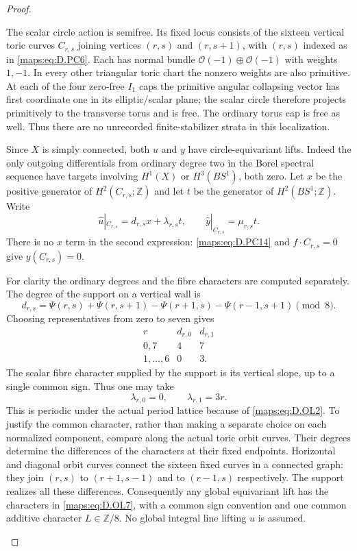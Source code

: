 \begin{proof}
\begin{enumerate}[label=\arabic*.,leftmargin=*]
The scalar circle action is semifree. Its fixed locus consists of
the sixteen vertical toric curves $C_{r,s}$ joining vertices
$(r,s)$ and $(r,s+1)$, with $(r,s)$ indexed as in \eqref{maps:eq:D.PC6}.
Each has normal bundle $\mathcal O(-1)\oplus\mathcal O(-1)$
with weights $1,-1$. In every other triangular toric chart the
nonzero weights are also primitive. At each of the four zero-free
$I_1$ caps the primitive angular collapsing vector has first
coordinate one in its elliptic/scalar plane; the scalar circle
therefore projects primitively to the transverse torus and is
free. The ordinary torus cap is free as well. Thus there are no
unrecorded finite-stabilizer strata in this localization.

Since $X$ is simply connected, both $u$ and $y$ have circle-equivariant
lifts. Indeed the only outgoing differentials from ordinary degree
two in the Borel spectral sequence have targets involving
$H^1(X)$ or $H^3(BS^1)$, both zero. Let $x$ be the positive
generator of $H^2(C_{r,s};\mathbb Z)$ and let $t$ be the generator
of $H^2(BS^1;\mathbb Z)$. Write
\[
 \widehat u|_{C_{r,s}}=d_{r,s}x+\lambda_{r,s}t,
 \qquad
 \widehat y|_{C_{r,s}}=\mu_{r,s}t.                         \tag{D.OL4}\label{maps:eq:D.OL4}
\]
There is no $x$ term in the second expression: \eqref{maps:eq:D.PC14} and
$f\cdot C_{r,s}=0$ give $y(C_{r,s})=0$.

For clarity the ordinary degrees and the fibre characters are
computed separately. The degree of the support on a vertical wall is
\[
 d_{r,s}=\Psi(r,s)+\Psi(r,s+1)
              -\Psi(r+1,s)-\Psi(r-1,s+1)\pmod8 .         \tag{D.OL5}\label{maps:eq:D.OL5}
\]
Choosing representatives from zero to seven gives
\[
\begin{array}{c|cc}
 r&d_{r,0}&d_{r,1}\\\hline
 0,7&4&7\\
 1,\ldots,6&0&3.
\end{array}                                                \tag{D.OL6}\label{maps:eq:D.OL6}
\]
The scalar fibre character supplied by the support is its vertical
slope, up to a single common sign. Thus one may take
\[
                 \lambda_{r,0}=0,\qquad
                 \lambda_{r,1}=3r .                      \tag{D.OL7}\label{maps:eq:D.OL7}
\]
This is periodic under the actual period lattice because of
\eqref{maps:eq:D.OL2}. To justify the common character, rather than making a
separate choice on each normalized component, compare along the
actual toric orbit curves. Their degrees determine the differences
of the characters at their fixed endpoints. Horizontal and diagonal
orbit curves connect the sixteen fixed curves in a connected graph:
they join $(r,s)$ to $(r+1,s-1)$ and to $(r-1,s)$ respectively.
The support realizes all these differences. Consequently any global
equivariant lift has the characters in \eqref{maps:eq:D.OL7}, with a common sign
convention and one common additive character $L\in\mathbb Z/8$.
No global integral line lifting $u$ is assumed.


\end{enumerate}
\end{proof}
